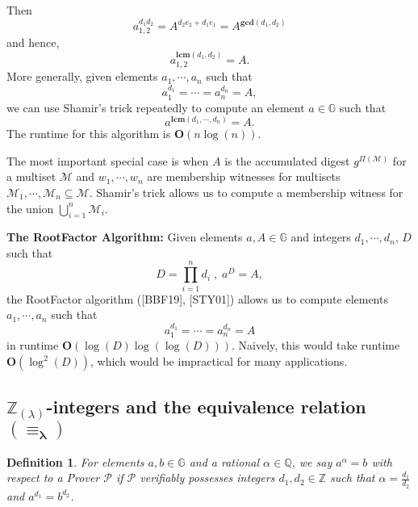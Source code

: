 \documentclass[11pt, lettersize, notitlepage, leqno, footskip=0.6cm]{article}
\newcommand{\bz}{\mathbb Z}
\newcommand{\bq}{\mathbb Q}
\newcommand{\pl}{\prod\limits}
\newcommand{\slim}{\sum\limits}
\newcommand{\mc}{\mathcal}
\newcommand{\mb}{\mathbb}
\newcommand{\mbf}{\mathbf}
\newcommand{\al}{\alpha}
\newcommand{\lam}{\lambda}
\newcommand{\lamb}{\lambda}
\newcommand{\sub}{\subseteq}
\newcommand{\mP}{\mc{P}}
\newcommand{\vs}{\vspace{-0.15cm}}
\newcommand{\op}{overwhelming probability}
\newcommand{\LCM}{\mbf{lcm}}
\newcommand{\GCD}{\mbf{gcd}}
\newtheorem{Def}{Definition}[section]
\numberwithin{equation}{section}
\begin{document}
\noindent Then \vspace{-0.15cm}$$a_{1,2}^{d_1d_2} = A^{d_2e_2 + d_1e_1} = A^{\GCD(d_1,d_2)}$$ and hence, \vspace{-0.15cm}$$a_{1,2}^{\LCM(d_1,d_2)} = A.$$ More generally, given elements $a_1,\cdots,a_n$ such that \vs $$a_1^{d_1} = \cdots = a_n^{d_n} = A, $$ we can use Shamir's trick repeatedly to compute an element $a\in\mb{G}$ such that \vs $$a^{\LCM(d_1,\cdots,d_n)} = A.$$ The runtime for this algorithm is $\mbf{O}(n\log(n))$.

The most important special case is when $A$ is the accumulated digest $g^{\Pi(\mc{M})}$ for a multiset $\mc{M}$ and $w_1,\cdots,w_n$ are membership witnesses for multisets $\mc{M}_1,\cdots,\mc{M}_n\sub \mc{M}$. Shamir's trick allows us to compute a membership witness for the union $\bigcup\limits_{i=1}^n \mc{M}_i$. 

\begin{comment} Conversely, for any element $b = \pl_{i=1}^n a_i^{x_i}$ $(x_i\in\bz)$, we have \vs $$ b^{\LCM(d_1,\cdots,d_n)} = A^{\slim_{i=1}^n  \frac{\LCM(d_1,\cdots,d_n)x_i}{d_i}} $$ and the low order assumption implies that with \op, \vs $$b =  a^{\slim_{i=1}^n  \frac{\LCM(d_1,\cdots,d_n)x_i}{d_i}}.$$ Thus, $b$ is expressible as a power of $a$. 

\end{comment}

\vspace{0.2cm}


\noindent \textbf{The RootFactor Algorithm:} Given elements $a, A\in\mb{G}$ and integers $d_1,\cdots, d_n$, $D$ such that \vs $$D= \pl_{i=1}^n d_i\; ,\; a^{D} = A,$$ the RootFactor algorithm ([BBF19], [STY01]) allows us to compute elements $a_1,\cdots, a_n$ such that \vs $$a_1^{d_1}=\cdots = a_n^{d_n} = A$$ in runtime $\mbf{O}(\log(D)\log(\log(D)))$. Naively, this would take runtime $\mbf{O}(\log^2(D))$, which would be impractical for many applications.


\subsection{\fontsize{11}{11}\selectfont $\bz_{(\lamb)}$-integers and the equivalence relation $\mathbf{(\equiv_{\lam})}$}


\begin{Def} For elements $a, b\in\mb{G}$ and a rational $\al\in\bq$, we say $a^{\al} = b$ with respect to a Prover $\mP$ if $\mP$ verifiably possesses integers $d_1,d_2\in\bz$ such that $\al = \frac{d_1}{d_2}$ and  $a^{d_1} = b^{d_2}$.\end{Def}
\end{document}
